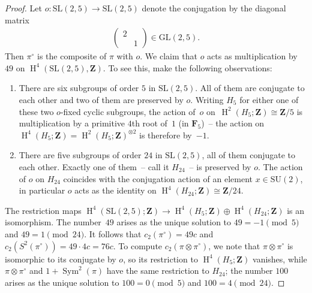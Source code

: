 \documentclass[pdftex]{sigma}
\numberwithin{equation}{section}
\newcommand\bF{\mathbf F}
\newcommand\bZ{\mathbf Z}
\DeclareMathOperator\homology{H}
\renewcommand\H{\homology}
\newcommand\<\langle
\renewcommand\>\rangle
\newcommand\SU{\mathrm{SU}}
\DeclareMathOperator\Sym{Sym}
\newcommand{\GL}{\mathrm{GL}}
\newcommand{\SL}{\mathrm{SL}}
\begin{document}
\begin{proof}
Let $o\colon \SL(2,5) \to \SL(2,5)$ denote the conjugation by the diagonal matrix
\begin{gather*}
\left(
\begin{matrix}
2 \\ & 1
\end{matrix}
\right) \in \GL(2,5).
\end{gather*}
Then $\pi^{\circ}$ is the composite of $\pi$ with $o$. We claim that $o$ acts as multiplication by $49$ on $\H^4(\SL(2,5),\bZ)$. To see this, make the following observations:
\begin{enumerate}\itemsep=0pt
\item There are six subgroups of order $5$ in $\SL(2,5)$. All of them are conjugate to each other and two of them are preserved by $o$.
Writing $H_5$ for either one of these two $o$-fixed cyclic subgroups, the action of~$o$ on~$\H^2(H_5;\bZ) \cong \bZ/5$ is multiplication by a primitive $4$th root of~$1$ (in $\bF_5$)~-- the action on $\H^4(H_5;\bZ) = \H^2(H_5;\bZ)^{\otimes 2}$ is therefore by~$-1$.
\item There are five subgroups of order $24$ in $\SL(2,5)$, all of them conjugate to each other. Exactly one of them~-- call it $H_{24}$~-- is preserved by $o$. The action of $o$ on $H_{24}$ coincides with the conjugation action of an element $x \in \SU(2)$, in particular $o$ acts as the identity on $\H^4(H_{24};\bZ) \cong \bZ/24$.
\end{enumerate}
The restriction maps $\H^4(\SL(2,5);\bZ) \to \H^4(H_5;\bZ) \oplus \H^4(H_{24};\bZ)$ is an isomorphism. The number~$49$ arises as the unique solution to $49 = -1 \pmod {5}$ and $49 = 1 \pmod {24}$. It follows that $c_2(\pi^{\circ}) = 49 c$ and $c_2(S^2(\pi^\circ)) = 49 \cdot 4c = 76c$. To compute $c_2(\pi \otimes \pi^{\circ})$, we note that $\pi \otimes \pi^{\circ}$ is isomorphic to its conjugate by $o$, so its restriction to $\H^4(H_5;\bZ)$ vanishes, while $\pi \otimes \pi^{\circ}$ and $1+ \Sym^2(\pi)$ have the same restriction to $H_{24}$; the number $100$ arises as the unique solution to $100 = 0 \pmod {5}$ and $100 = 4 \pmod {24}$.
\end{proof}
\end{document}
